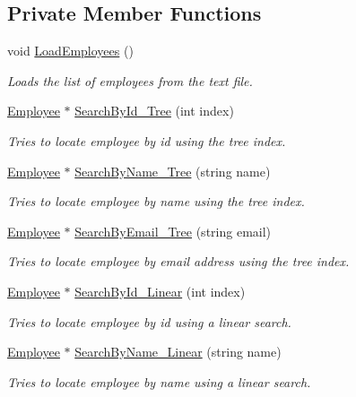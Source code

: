 \subsection*{Private Member Functions}
\begin{DoxyCompactItemize}
\item 
void \hyperlink{classEmployeeManager_a799fffb1b9cf55d22192f518523b90bb}{Load\+Employees} ()
\begin{DoxyCompactList}\small\item\em Loads the list of employees from the text file. \end{DoxyCompactList}\item 
\hyperlink{structEmployee}{Employee} $\ast$ \hyperlink{classEmployeeManager_a4bf226cae634590b42ae7daf26ae7a5a}{Search\+By\+Id\+\_\+\+Tree} (int index)
\begin{DoxyCompactList}\small\item\em Tries to locate employee by id using the tree index. \end{DoxyCompactList}\item 
\hyperlink{structEmployee}{Employee} $\ast$ \hyperlink{classEmployeeManager_a462f98c10a16addf9656f1e59ae109ed}{Search\+By\+Name\+\_\+\+Tree} (string name)
\begin{DoxyCompactList}\small\item\em Tries to locate employee by name using the tree index. \end{DoxyCompactList}\item 
\hyperlink{structEmployee}{Employee} $\ast$ \hyperlink{classEmployeeManager_aa35d0748e3b7a34f40f24e5b7ae4ad53}{Search\+By\+Email\+\_\+\+Tree} (string email)
\begin{DoxyCompactList}\small\item\em Tries to locate employee by email address using the tree index. \end{DoxyCompactList}\item 
\hyperlink{structEmployee}{Employee} $\ast$ \hyperlink{classEmployeeManager_af2d57cf6bc77893edfef2a1403c993c9}{Search\+By\+Id\+\_\+\+Linear} (int index)
\begin{DoxyCompactList}\small\item\em Tries to locate employee by id using a linear search. \end{DoxyCompactList}\item 
\hyperlink{structEmployee}{Employee} $\ast$ \hyperlink{classEmployeeManager_a24a120173edd4c5e0a65af90d1dc5c12}{Search\+By\+Name\+\_\+\+Linear} (string name)
\begin{DoxyCompactList}\small\item\em Tries to locate employee by name using a linear search. \end{DoxyCompactList}\item 

\end{DoxyCompactItemize}
